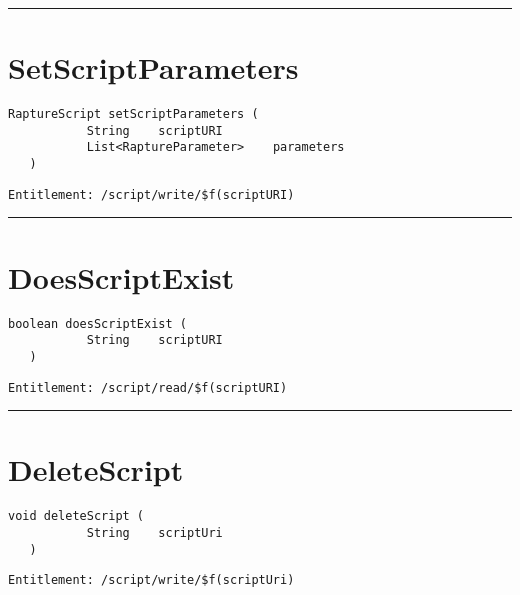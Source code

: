 \rule{12cm}{2pt}
\section{SetScriptParameters}
\label{Api:SetScriptParameters}
\begin{lstlisting}[style=nonumbers]
   RaptureScript setScriptParameters (
           String    scriptURI
           List<RaptureParameter>    parameters
   )
\end{lstlisting}
\begin{Verbatim}[formatcom=\color{Maroon}]
  Entitlement: /script/write/$f(scriptURI)
\end{Verbatim}



\rule{12cm}{2pt}
\section{DoesScriptExist}
\label{Api:DoesScriptExist}
\begin{lstlisting}[style=nonumbers]
   boolean doesScriptExist (
           String    scriptURI
   )
\end{lstlisting}
\begin{Verbatim}[formatcom=\color{Maroon}]
  Entitlement: /script/read/$f(scriptURI)
\end{Verbatim}



\rule{12cm}{2pt}
\section{DeleteScript}
\label{Api:DeleteScript}
\begin{lstlisting}[style=nonumbers]
   void deleteScript (
           String    scriptUri
   )
\end{lstlisting}
\begin{Verbatim}[formatcom=\color{Maroon}]
  Entitlement: /script/write/$f(scriptUri)
\end{Verbatim}



